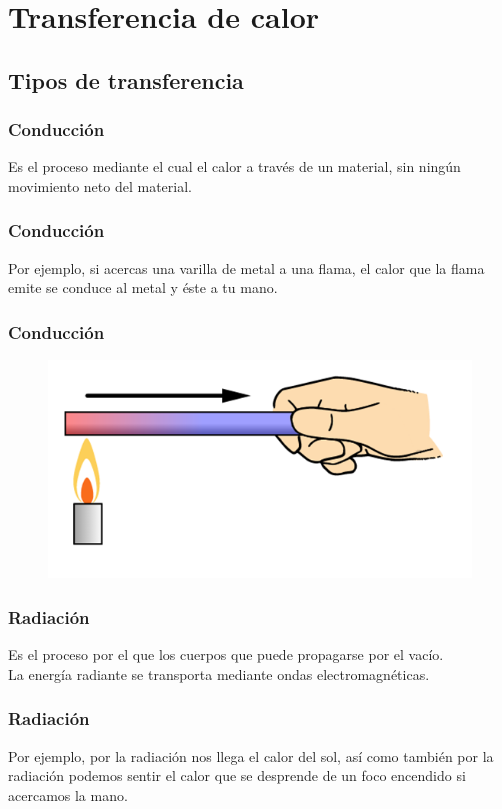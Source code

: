 \documentclass[14pt]{beamer}
\begin{document}
\section{Transferencia de calor}
\subsection{Tipos de transferencia}

\begin{frame}
\frametitle{Conducción}
Es el proceso mediante el cual el calor  a través de un material, \pause sin ningún
movimiento neto del material.
\end{frame}
\begin{frame}
\frametitle{Conducción}    
Por ejemplo, si acercas una varilla de metal a una flama, el calor que la flama emite se conduce al metal y éste a tu mano.
\end{frame}
\begin{frame}
\frametitle{Conducción}
\begin{figure}
    \centering
    \includegraphics[scale=0.5]{Imagenes/Calor_03.png}
\end{figure}
\end{frame}
\begin{frame}
\frametitle{Radiación}
Es el proceso por el que los cuerpos  que puede propagarse por el vacío.
\\
\bigskip
\pause
La energía radiante se transporta mediante ondas electromagnéticas.
\end{frame}
\begin{frame}
\frametitle{Radiación}
Por ejemplo, por la radiación nos llega el calor del sol, así como también por la radiación podemos sentir el
calor que se desprende de un foco encendido si acercamos la mano.
\end{frame}
\end{document}
